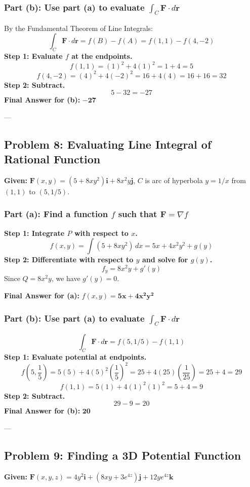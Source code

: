 \documentclass[12pt]{article}
\begin{document}
\subsubsection*{Part (b): Use part (a) to evaluate $\int_C \mathbf{F} \cdot d\mathbf{r}$}
By the Fundamental Theorem of Line Integrals:
\[
\int_C \mathbf{F} \cdot d\mathbf{r} = f(B) - f(A) = f(1, 1) - f(4, -2)
\]
\textbf{Step 1: Evaluate $f$ at the endpoints.}
\[
f(1, 1) = (1)^2 + 4(1)^2 = 1 + 4 = 5
\]
\[
f(4, -2) = (4)^2 + 4(-2)^2 = 16 + 4(4) = 16 + 16 = 32
\]
\textbf{Step 2: Subtract.}
\[
5 - 32 = -27
\]
\textbf{Final Answer for (b):} $\mathbf{-27}$

---

\subsection{Problem 8: Evaluating Line Integral of Rational Function}
\textbf{Given:} $\mathbf{F}(x, y) = (5 + 8xy^2)\mathbf{i} + 8x^2y\mathbf{j}$, $C$ is arc of hyperbola $y = 1/x$ from $(1, 1)$ to $(5, 1/5)$.

\subsubsection*{Part (a): Find a function $f$ such that $\mathbf{F} = \nabla f$}
\textbf{Step 1: Integrate $P$ with respect to $x$.}
\[
f(x, y) = \int (5 + 8xy^2) \, dx = 5x + 4x^2y^2 + g(y)
\]
\textbf{Step 2: Differentiate with respect to $y$ and solve for $g(y)$.}
\[
f_y = 8x^2y + g'(y)
\]
Since $Q = 8x^2y$, we have $g'(y) = 0$.

\textbf{Final Answer for (a):} $f(x,y) = \mathbf{5x + 4x^2y^2}$

\subsubsection*{Part (b): Use part (a) to evaluate $\int_C \mathbf{F} \cdot d\mathbf{r}$}
\[
\int_C \mathbf{F} \cdot d\mathbf{r} = f(5, 1/5) - f(1, 1)
\]
\textbf{Step 1: Evaluate potential at endpoints.}
\[
f\left(5, \frac{1}{5}\right) = 5(5) + 4(5)^2\left(\frac{1}{5}\right)^2 = 25 + 4(25)\left(\frac{1}{25}\right) = 25 + 4 = 29
\]
\[
f(1, 1) = 5(1) + 4(1)^2(1)^2 = 5 + 4 = 9
\]
\textbf{Step 2: Subtract.}
\[
29 - 9 = 20
\]
\textbf{Final Answer for (b):} $\mathbf{20}$

---

\subsection{Problem 9: Finding a 3D Potential Function}
\textbf{Given:} $\mathbf{F}(x, y, z) = 4y^2\mathbf{i} + (8xy + 3e^{4z})\mathbf{j} + 12ye^{4z}\mathbf{k}$
\end{document}
